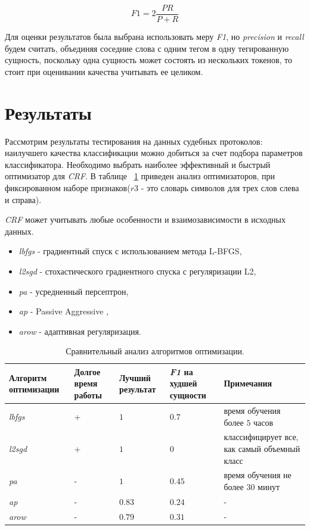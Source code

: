\documentclass{csmathnotes}
\begin{document}
\begin{equation}\label{eq:f1}
F1 = 2\frac{P R}{P + R} 
\end{equation}

Для оценки результатов была выбрана использовать меру \emph{F1}, но \emph{precision} и \emph{recall} будем считать, объединяя соседние слова с одним тегом в одну тегированную сущность, поскольку одна сущность может состоять из нескольких токенов, то стоит при оценивании качества учитывать ее целиком. 

\section*{Результаты}
Рассмотрим результаты тестирования на данных судебных протоколов: наилучшего качества классификации можно добиться за счет подбора параметров классификатора. Необходимо выбрать наиболее эффективный и быстрый оптимизатор для \emph{CRF}. В таблице ~\ref{tabl:table1} приведен анализ оптимизаторов, при фиксированном наборе признаков($r3$ - это словарь символов для трех слов слева и справа).


\emph{CRF} может учитывать любые особенности и взаимозависимости в исходных данных.
\begin{itemize}
	\item \emph{lbfgs} - градиентный спуск с использованием метода 
	L-BFGS,
	\item \emph{l2sgd} - стохастического  градиентного спуска  с регуляризации L2,
	\item \emph{pa} - усредненный персептрон,
	\item \emph{ap} - Passive Aggressive ,
	\item \emph{arow} - адаптивная регуляризация.
\end{itemize}

\begin{table}[!h]
    \begin{center}
        \begin{tabular}{|p{2cm}|p{1.6cm}|p{1.5cm}|p{1.5cm}|p{2.5cm}|}
            \hline
            Алгоритм оптимизации &  Долгое время работы & Лучший результат & \emph{F1} на худшей сущности & Примечания \\
            \hline
            \emph{lbfgs} & + & $1$ & $0.7$ & время обучения более $5$ часов  \\
            \hline
            \emph{l2sgd} & + & $1$  & $0$ & классифицирует все, как самый объемный класс \\
            \hline
            \emph{pa} & - & $1$  & $0.45$ & время обучения не более $30$ минут \\
            \hline
            \emph{ap} & - & $0.83$ & $0.24$  & - \\
            \hline
            \emph{arow} & - & $0.79$ & $0.31$  & - \\
            \hline
        \end{tabular}
    \end{center}
    \caption{\label{tabl:table1}Сравнительный анализ алгоритмов оптимизации.}
\end{table}
\end{document}
